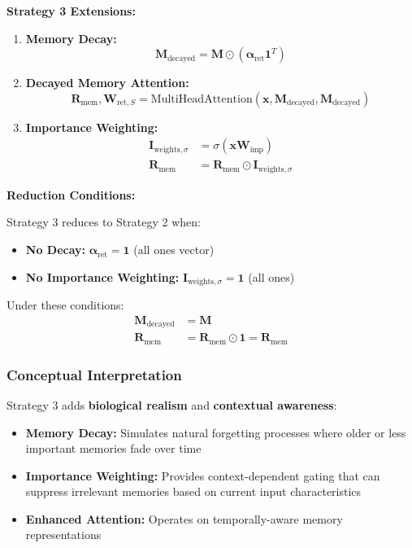 \documentclass{article}
\begin{document}
\textbf{Strategy 3 Extensions:}
\begin{enumerate}
\item \textbf{Memory Decay:}
\begin{equation}
\mathbf{M}_{\text{decayed}} = \mathbf{M} \odot (\boldsymbol{\alpha}_{\text{ret}} \mathbf{1}^T)
\end{equation}

\item \textbf{Decayed Memory Attention:}
\begin{equation}
\mathbf{R}_{\text{mem}}, \mathbf{W}_{\text{ret},S} = \text{MultiHeadAttention}(\mathbf{x}, \mathbf{M}_{\text{decayed}}, \mathbf{M}_{\text{decayed}})
\end{equation}

\item \textbf{Importance Weighting:}
\begin{align}
\mathbf{I}_{\text{weights},\sigma} &= \sigma(\mathbf{x} \mathbf{W}_{\text{imp}}) \\
\mathbf{R}_{\text{mem}} &= \mathbf{R}_{\text{mem}} \odot \mathbf{I}_{\text{weights},\sigma}
\end{align}
\end{enumerate}

\textbf{Reduction Conditions:}

Strategy 3 reduces to Strategy 2 when:
\begin{itemize}
\item \textbf{No Decay:} $\boldsymbol{\alpha}_{\text{ret}} = \mathbf{1}$ (all ones vector)
\item \textbf{No Importance Weighting:} $\mathbf{I}_{\text{weights},\sigma} = \mathbf{1}$ (all ones)
\end{itemize}

Under these conditions:
\begin{align}
\mathbf{M}_{\text{decayed}} &= \mathbf{M} \\
\mathbf{R}_{\text{mem}} &= \mathbf{R}_{\text{mem}} \odot \mathbf{1} = \mathbf{R}_{\text{mem}}
\end{align}

\subsubsection{Conceptual Interpretation}

Strategy 3 adds \textbf{biological realism} and \textbf{contextual awareness}:

\begin{itemize}
\item \textbf{Memory Decay:} Simulates natural forgetting processes where older or less important memories fade over time
\item \textbf{Importance Weighting:} Provides context-dependent gating that can suppress irrelevant memories based on current input characteristics
\item \textbf{Enhanced Attention:} Operates on temporally-aware memory representations
\end{itemize}
\end{document}

